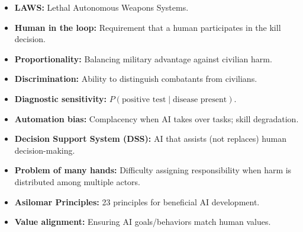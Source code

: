 \begin{defbox}
\begin{itemize}
  \item \textbf{LAWS:} Lethal Autonomous Weapons Systems.
  \item \textbf{Human in the loop:} Requirement that a human participates in the kill decision.
  \item \textbf{Proportionality:} Balancing military advantage against civilian harm.
  \item \textbf{Discrimination:} Ability to distinguish combatants from civilians.
  \item \textbf{Diagnostic sensitivity:} $P(\text{positive test} \mid \text{disease present})$.
  \item \textbf{Automation bias:} Complacency when AI takes over tasks; skill degradation.
  \item \textbf{Decision Support System (DSS):} AI that assists (not replaces) human decision-making.
  \item \textbf{Problem of many hands:} Difficulty assigning responsibility when harm is distributed among multiple actors.
  \item \textbf{Asilomar Principles:} 23 principles for beneficial AI development.
  \item \textbf{Value alignment:} Ensuring AI goals/behaviors match human values.
\end{itemize}
\end{defbox}

